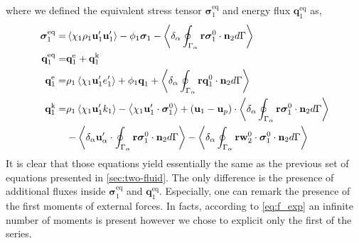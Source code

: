 where we defined the equivalent stress tensor $\bm{\sigma}_1^\text{eq}$ and energy flux $\textbf{q}^\text{eq}_1$ as,
\begin{align}
    \label{eq:sigma_eq_def}
    \bm{\sigma}_1^\text{eq}
    =& 
    \avg{\chi_1\rho_1\textbf{u}_1'\textbf{u}_1'}
    - \phi_1 \bm{\sigma}_1%
    - \pSavg{{\textbf{r}\bm{\sigma}_1^0 \cdot \textbf{n}_2}}\\
    \textbf{q}_1^\text{eq}
    =&\textbf{q}_1^\text{e} +\textbf{q}_1^\text{k}  \nonumber\\
    \textbf{q}_1^\text{e}
    =& \rho_1 \avg{\chi_1 \textbf{u}_1' e_1'} 
    + \phi_1\textbf{q}_1 
    +\pSavg{{\textbf{r}\textbf{q}_1^0 \cdot \textbf{n}_2}} 
    \nonumber\\
    \textbf{q}_1^\text{k}
    =& \rho_1 \avg{\chi_1 \textbf{u}_1' k_1} 
    - \avg{\chi_1 \textbf{u}_1' \cdot \bm{\sigma}_1^0}
    + (\textbf{u}_1 - \textbf{u}_p)\cdot
    \pSavg{{\textbf{r}\bm{\sigma}_1^0 \cdot \textbf{n}_2}}
    \nonumber\\\nonumber&
    - \pavg{ \textbf{u}_\alpha' \cdot \intS{ \textbf{r} \bm{\sigma}_1^0 \cdot \textbf{n}_2}}
    - \pavg{ \intS{\textbf{r}\textbf{w}_2^0 \cdot \bm{\sigma}_1^0 \cdot \textbf{n}_2}}
\end{align}
It is clear that those equations yield essentially the same as the previous set of equations presented in \ref{sec:two-fluid}.
The only difference is the presence of additional fluxes inside $\bm{\sigma}^\text{eq}_1$ and $\textbf{q}^\text{eq}_1$. 
Especially, one can remark the presence of the first moments of external forces. 
In facts, according to \ref{eq:f_exp} an infinite number of moments is present however we chose to explicit only the first of the series. 

